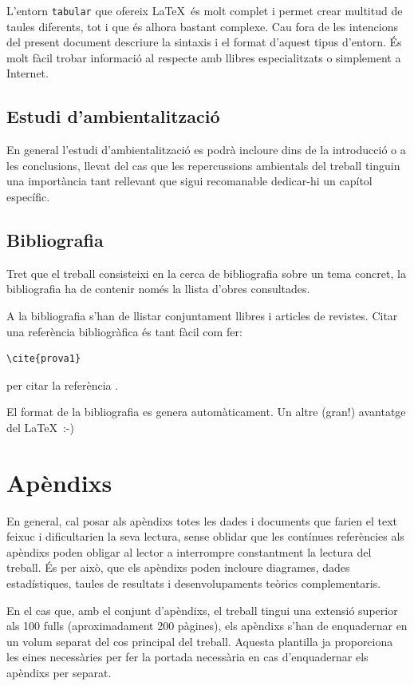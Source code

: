L'entorn \texttt{tabular} que ofereix \LaTeX \ és molt complet i permet crear multitud de taules diferents, tot i que és alhora bastant complexe. Cau fora de les intencions del present document descriure la sintaxis i el format d'aquest tipus d'entorn. És molt fàcil trobar informació al respecte amb llibres especialitzats o simplement a Internet. 


\subsection{Estudi d'ambientalització}

En general l'estudi d'ambientalització es podrà incloure dins de la introducció o a les conclusions, llevat del cas que les repercussions ambientals del treball tinguin una importància tant rellevant que sigui recomanable dedicar-hi un capítol específic.


\subsection{Bibliografia}

Tret que el treball consisteixi en la cerca de bibliografia sobre un tema concret, la bibliografia ha de contenir només la llista d'obres consultades.

A la bibliografia s'han de llistar conjuntament llibres i articles de revistes. Citar una referència bibliogràfica és tant fàcil com fer:

\begin{verbatim}
\cite{prova1}
\end{verbatim}

per citar la referència \cite{prova1}.

El format de la bibliografia es genera automàticament. Un altre (gran!) avantatge del \LaTeX \ :-)


\section{Apèndixs}

En general, cal posar als apèndixs totes les dades i documents que farien el text feixuc i dificultarien la seva lectura, sense oblidar que les contínues referències als apèndixs poden obligar al lector a interrompre constantment la lectura del treball. És per això, que els apèndixs poden incloure diagrames, dades estadístiques, taules de resultats i desenvolupaments teòrics complementaris.

En el cas que, amb el conjunt d'apèndixs, el treball tingui una extensió superior als 100 fulls (aproximadament 200 pàgines), els apèndixs s'han de enquadernar en un volum separat del cos principal del treball. Aquesta plantilla ja proporciona les eines necessàries per fer la portada necessària en cas d'enquadernar els apèndixs per separat.
